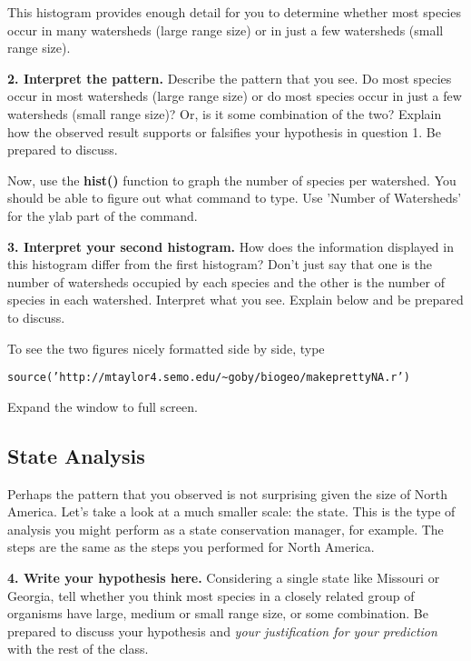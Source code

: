 \documentclass[11pt]{article}
\begin{document}
This histogram provides enough detail for you to determine whether most
species occur in many watersheds (large range size) or in just a few
watersheds (small range size).

\textbf{2. Interpret the pattern.} Describe the pattern that you see. Do most
species occur in most watersheds (large range size) or do most species
occur in just a few watersheds (small range size)? Or, is it some
combination of the two? Explain how the observed result supports or
falsifies your hypothesis in question 1. Be prepared to discuss.

\vspace{7\baselineskip}

Now, use the \textbf{hist()} function to graph the number of species per
watershed. You should be able to figure out what command to type. Use 'Number 
of Watersheds' for the ylab part of the command.

\textbf{3. Interpret your second histogram.} How does the information displayed
in this histogram differ from the first histogram? Don't just say that
one is the number of watersheds occupied by each species and the other
is the number of species in each watershed. Interpret what you see.
Explain below and be prepared to discuss.

\vspace{7\baselineskip}

To see the two figures nicely formatted side by side, type

\texttt{source('http://mtaylor4.semo.edu/\textasciitilde{}goby/biogeo/makeprettyNA.r')}

Expand the window to full screen. 

\subsection*{State Analysis}

Perhaps the pattern that you observed is not surprising given the size
of North America. Let's take a look at a much smaller scale: the state.
This is the type of analysis you might perform as a state conservation
manager, for example. The steps are the same as the steps you
performed for North America.

\textbf{4. Write your hypothesis here.} Considering a single state like Missouri
or Georgia, tell whether you think most species in a closely related
group of organisms have large, medium or small range size, or some
combination. Be prepared to discuss your hypothesis and \emph{your
justification for your prediction} with the rest of the class.
\end{document}
